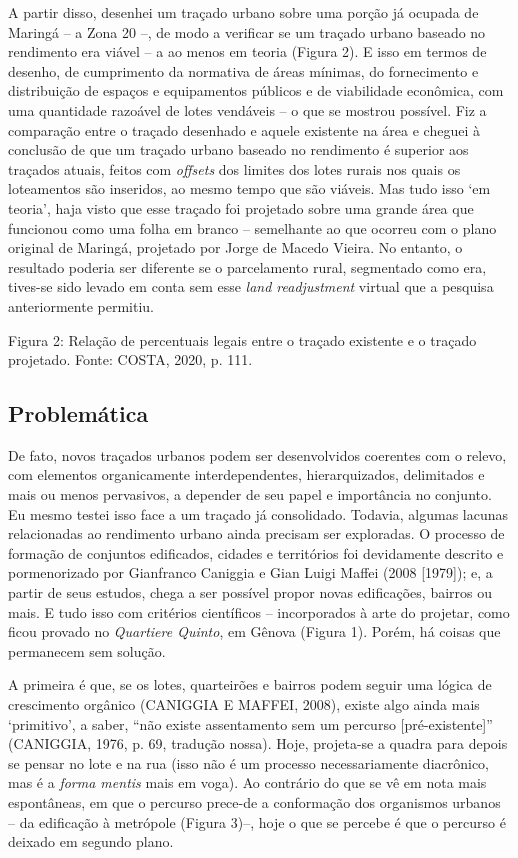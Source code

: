 \documentclass[twoside, 12pt]{book}
\begin{document}
        A partir disso, desenhei um traçado urbano sobre uma porção já ocupada de Maringá – a Zona 20 –, de modo a verificar se um traçado urbano baseado no rendimento era viável – a ao menos em teoria (Figura 2). E isso em termos de desenho, de cumprimento da normativa de áreas mínimas, do fornecimento e distribuição de espaços e equipamentos públicos e de viabilidade econômica, com uma quantidade razoável de lotes vendáveis – o que se mostrou possível. Fiz a comparação entre o traçado desenhado e aquele existente na área e cheguei à conclusão de que um traçado urbano baseado no rendimento é superior aos traçados atuais, feitos com \textit{offsets} dos limites dos lotes rurais nos quais os loteamentos são inseridos, ao mesmo tempo que são viáveis. Mas tudo isso ‘em teoria’, haja visto que esse traçado foi projetado sobre uma grande área que funcionou como uma folha em branco – semelhante ao que ocorreu com o plano original de Maringá, projetado por Jorge de Macedo Vieira. No entanto, o resultado poderia ser diferente se o parcelamento rural, segmentado como era, tives-se sido levado em conta sem esse \textit{land readjustment} virtual que a pesquisa anteriormente permitiu.
 
        \caption{Figura 2: Relação de percentuais legais entre o traçado existente e o traçado projetado. Fonte: COSTA, 2020, p. 111.}

    \subsection{Problemática}

        De fato, novos traçados urbanos podem ser desenvolvidos coerentes com o relevo, com elementos organicamente interdependentes, hierarquizados, delimitados e mais ou menos pervasivos, a depender de seu papel e importância no conjunto. Eu mesmo testei isso face a um traçado já consolidado. Todavia, algumas lacunas relacionadas ao rendimento urbano ainda precisam ser exploradas. O processo de formação de conjuntos edificados, cidades e territórios foi devidamente descrito e pormenorizado por Gianfranco Caniggia e Gian Luigi Maffei (2008 [1979]); e, a partir de seus estudos, chega a ser possível propor novas edificações, bairros ou mais. E tudo isso com critérios científicos – incorporados à arte do projetar, como ficou provado no \textit{Quartiere Quinto}, em Gênova (Figura 1). Porém, há coisas que permanecem sem solução.

        A primeira é que, se os lotes, quarteirões e bairros podem seguir uma lógica de crescimento orgânico (CANIGGIA E MAFFEI, 2008), existe algo ainda mais ‘primitivo’, a saber, “não existe assentamento sem um percurso [pré-existente]” (CANIGGIA, 1976, p. 69, tradução nossa). Hoje, projeta-se a quadra para depois se pensar no lote e na rua (isso não é um processo necessariamente diacrônico, mas é a \textit{forma mentis} mais em voga). Ao contrário do que se vê em nota mais espontâneas, em que o percurso prece-de a conformação dos organismos urbanos – da edificação à metrópole (Figura 3)–,   hoje o que se percebe é que o percurso é deixado em segundo plano.
\end{document}
